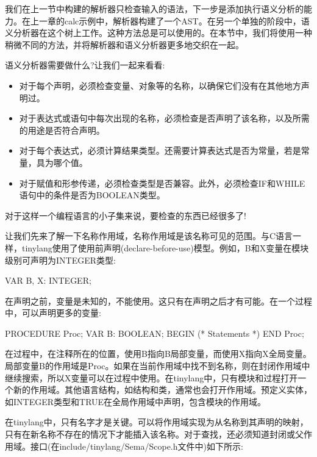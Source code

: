 
我们在上一节中构建的解析器只检查输入的语法，下一步是添加执行语义分析的能力。在上一章的calc示例中，解析器构建了一个AST。在另一个单独的阶段中，语义分析器在这个树上工作。这种方法总是可以使用的。在本节中，我们将使用一种稍微不同的方法，并将解析器和语义分析器更多地交织在一起。

语义分析器需要做什么?让我们一起来看看:

\begin{itemize}
\item
对于每个声明，必须检查变量、对象等的名称，以确保它们没有在其他地方声明过。

\item
对于表达式或语句中每次出现的名称，必须检查是否声明了该名称，以及所需的用途是否符合声明。

\item
对于每个表达式，必须计算结果类型。还需要计算表达式是否为常量，若是常量，具为哪个值。

\item
对于赋值和形参传递，必须检查类型是否兼容。此外，必须检查IF和WHILE语句中的条件是否为BOOLEAN类型。
\end{itemize}

对于这样一个编程语言的小子集来说，要检查的东西已经很多了!


让我们先来了解一下名称作用域，名称作用域是该名称可见的范围。与C语言一样，tinylang使用了使用前声明(declare-before-use)模型。例如，B和X变量在模块级别可声明为INTEGER类型:

\begin{shell}
VAR B, X: INTEGER;
\end{shell}

在声明之前，变量是未知的，不能使用。这只有在声明之后才有可能。在一个过程中，可以声明更多的变量:

\begin{shell}
PROCEDURE Proc;
VAR B: BOOLEAN;
BEGIN
    (* Statements *)
END Proc;
\end{shell}

在过程中，在注释所在的位置，使用B指向B局部变量，而使用X指向X全局变量。局部变量B的作用域是Proc。如果在当前作用域中找不到名称，则在封闭作用域中继续搜索，所以X变量可以在过程中使用。在tinylang中，只有模块和过程打开一个新的作用域。其他语言结构，如结构和类，通常也会打开作用域。预定义实体，如INTEGER类型和TRUE在全局作用域中声明，包含模块的作用域。

在tinylang中，只有名字才是关键。可以将作用域实现为从名称到其声明的映射，只有在新名称不存在的情况下才能插入该名称。对于查找，还必须知道封闭或父作用域。接口(在include/tinylang/Sema/Scope.h文件中)如下所示:


